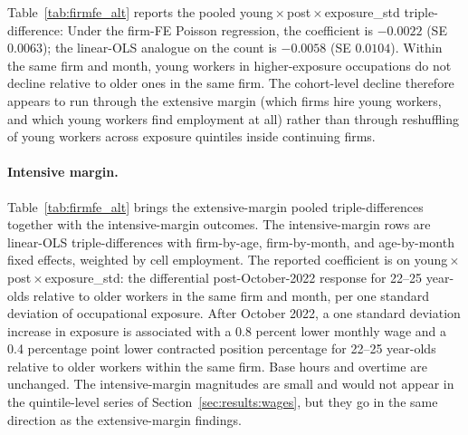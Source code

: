 Table~\ref{tab:firmfe_alt} reports the pooled young\,$\times$\,post\,$\times$\,exposure\_std triple-difference: Under the firm-FE Poisson regression, the coefficient is $-0.0022$ (SE $0.0063$); the linear-OLS analogue on the count is $-0.0058$ (SE $0.0104$). Within the same firm and month, young workers in higher-exposure occupations do not decline relative to older ones in the same firm. The cohort-level decline therefore appears to run through the extensive margin (which firms hire young workers, and which young workers find employment at all) rather than through reshuffling of young workers across exposure quintiles inside continuing firms.

\paragraph{Intensive margin.}
Table~\ref{tab:firmfe_alt} brings the extensive-margin pooled triple-differences together with the intensive-margin outcomes. The intensive-margin rows are linear-OLS triple-differences with firm-by-age, firm-by-month, and age-by-month fixed effects, weighted by cell employment. The reported coefficient is on young\,$\times$\,post\,$\times$\,exposure\_std: the differential post-October-2022 response for 22--25 year-olds relative to older workers in the same firm and month, per one standard deviation of occupational exposure. After October 2022, a one standard deviation increase in exposure is associated with a 0.8 percent lower monthly wage and a 0.4 percentage point lower contracted position percentage for 22--25 year-olds relative to older workers within the same firm. Base hours and overtime are unchanged. The intensive-margin magnitudes are small and would not appear in the quintile-level series of Section~\ref{sec:results:wages}, but they go in the same direction as the extensive-margin findings.


